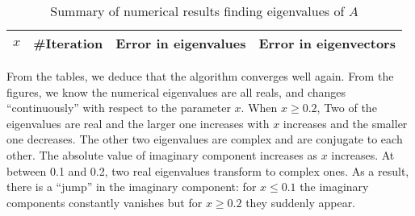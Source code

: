 \documentclass[english, nochinese]{pnote}
\begin{document}
\begin{table}
\centering
\begin{tabular}{|c|c|c|c|}
\hline
$x$ & \#Iteration & Error in eigenvalues & Error in eigenvectors \\
\hline

\end{tabular}
\caption{Summary of numerical results finding eigenvalues of $A$}
\label{Tbl:Eigen}
\end{table}

From the tables, we deduce that the algorithm converges well again. From the figures, we know the numerical eigenvalues are all reals, and changes ``continuously'' with respect to the parameter $x$. When $ x \ge 0.2 $, Two of the eigenvalues are real and the larger one increases with $x$ increases and the smaller one decreases. The other two eigenvalues are complex and are conjugate to each other. The absolute value of imaginary component increases as $x$ increases. At between 0.1 and 0.2, two real eigenvalues transform to complex ones. As a result, there is a ``jump'' in the imaginary component: for $ x \le 0.1 $ the imaginary components constantly vanishes but for $ x \ge 0.2 $ they suddenly appear.
\end{document}
